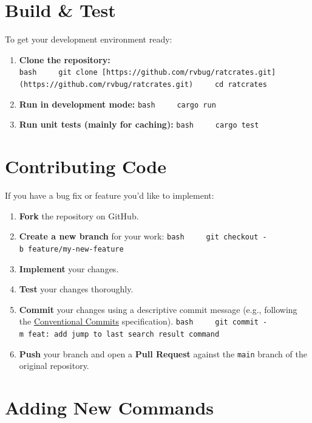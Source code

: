 \documentclass[
  letterpaper,
  DIV=11,
  numbers=noendperiod]{scrreprt}
\providecommand{\tightlist}{%
  \setlength{\itemsep}{0pt}\setlength{\parskip}{0pt}}
\begin{document}
\section{Build \& Test}\label{build-test}

To get your development environment ready:

\begin{enumerate}
\def\labelenumi{\arabic{enumi}.}
\tightlist
\item
  \textbf{Clone the repository:}
  \texttt{bash\ \ \ \ \ git\ clone\ {[}https://github.com/rvbug/ratcrates.git{]}(https://github.com/rvbug/ratcrates.git)\ \ \ \ \ cd\ ratcrates}
\item
  \textbf{Run in development mode:} \texttt{bash\ \ \ \ \ cargo\ run}
\item
  \textbf{Run unit tests (mainly for caching):}
  \texttt{bash\ \ \ \ \ cargo\ test}
\end{enumerate}

\section{Contributing Code}\label{contributing-code}

If you have a bug fix or feature you'd like to implement:

\begin{enumerate}
\def\labelenumi{\arabic{enumi}.}
\tightlist
\item
  \textbf{Fork} the repository on GitHub.
\item
  \textbf{Create a new branch} for your work:
  \texttt{bash\ \ \ \ \ git\ checkout\ -b\ feature/my-new-feature}
\item
  \textbf{Implement} your changes.
\item
  \textbf{Test} your changes thoroughly.
\item
  \textbf{Commit} your changes using a descriptive commit message (e.g.,
  following the
  \href{https://www.conventionalcommits.org/en/v1.0.0/}{Conventional
  Commits} specification).
  \texttt{bash\ \ \ \ \ git\ commit\ -m\ \textquotesingle{}feat:\ add\ jump\ to\ last\ search\ result\ command\textquotesingle{}}
\item
  \textbf{Push} your branch and open a \textbf{Pull Request} against the
  \texttt{main} branch of the original repository.
\end{enumerate}

\section{Adding New Commands}\label{adding-new-commands}
\end{document}
